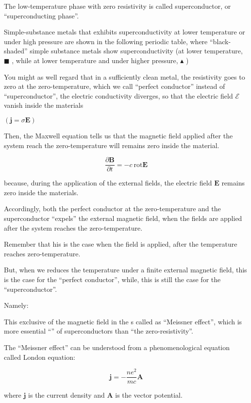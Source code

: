 The low-temperature phase with zero resistivity is called superconductor, or ``superconducting phase''. 

Simple-substance metals that exhibits superconductivity at lower temperature or under high pressure are shown in the following periodic table, where ``black-shaded'' simple substance metals show superconductivity (at lower temperature, $\blacksquare$ , while at lower temperature and under higher pressure, $\blacktriangle$ )

You might as well regard that in a sufficiently clean metal, the resistivity goes to zero at the zero-temperature, which we call ``perfect conductor'' instead of ``superconductor'', the electric conductivity diverges, so that the electric field $\mathscr{E}$ vanish inside the materials 

\noindent $(\bm{j} = \sigma \bm{E}) $

Then, the Maxwell equation tells us that the magnetic field {} applied after the system reach the zero-temperature will remains zero inside the material. 

\[\frac{\partial \bm{B}}{\partial t} = -c\ \text{rot}\bm{E} \]

because, during the application of the external fields, the electric field $\bm{E}$ remains zero inside the materials. 

Accordingly, both the perfect conductor at the zero-temperature and the superconductor ``expels'' the external magnetic field, when the fields are applied {} after the system reaches the zero-temperature. 

Remember that his is the case when the field is applied, after the temperature reaches zero-temperature. 

But, when we reduces the temperature under a finite external magnetic field, this is {} the case for the ``perfect conductor'', while, this is still the case for the ``superconductor''. 

Namely: 

This exclusive of the magnetic field in the {} s called as ``Meissner effect'', which is more essential ``'' of superconductors than ``the zero-resistivity''. 

The ``Meissner effect'' can be understood from a phenomenological equation called London equation: 

\[\bm{j} = -\frac{ne^2}{mc}\bm{A} \]

where $\bm{j}$ is the current density and $\bm{A}$ is the vector potential. 

